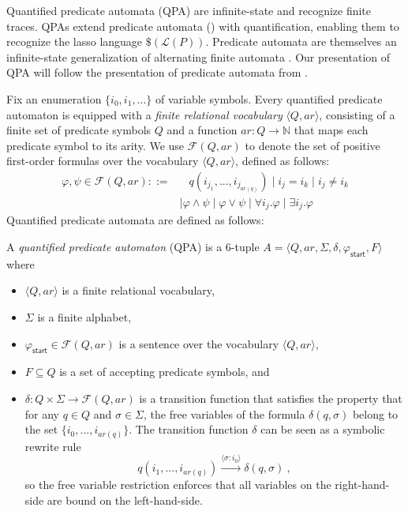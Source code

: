 \documentclass[9pt,nocopyrightspace]{sigplanconf}
\theoremstyle{definition}
\newcommand{\tuple}[1]{\langle #1 \rangle}
\newcommand{\ic}[2]{{\tuple{#1 : #2}}}
\newcommand{\lang}{\mathcal{L}}
\newcommand{\start}{\mathsf{start}}
\renewcommand{\phi}{\varphi}
\newcommand{\formulae}{\mathcal{F}}
\newcommand{\ar}{\textit{ar}}
\newcommand{\ftrace}{finite trace}
\begin{document}
Quantified predicate automata (QPA) are infinite-state and recognize \ftrace{}s.  QPAs extend predicate automata
(\cite{Farzan2015}) with quantification, enabling them to recognize the
lasso language $\$(\lang(P))$.  Predicate automata are themselves
an infinite-state generalization of alternating finite automata
\cite{Brzozowski1980,Chandra1981}.  Our presentation of QPA will follow the
presentation of predicate automata from \cite{Farzan2015}.

Fix an enumeration $\{i_0,i_1,...\}$ of variable symbols.  Every
quantified predicate automaton is equipped with a \emph{finite relational
  vocabulary} $\tuple{Q,\ar}$, consisting of a finite set of predicate symbols
$Q$ and a function $\ar : Q \rightarrow \mathbb{N}$ that maps each predicate
symbol to its arity.  We use $\formulae(Q,\ar)$ to denote the set of positive
first-order formulas over the vocabulary $\tuple{Q,\ar}$, defined as follows:
\begin{align*}
  \phi,\psi \in \formulae(Q,\ar) ::= &\;\;\; q(i_{j_1},...,i_{j_{\ar(q)}}) \mid i_{j} = i_k \mid i_j \neq i_k\\
  & \mid \phi \land \psi \mid \phi \lor \psi \mid \forall i_j. \phi \mid \exists i_j. \phi
\end{align*}
Quantified predicate automata are defined as follows:
\begin{definition}
  A \emph{quantified predicate automaton} (QPA) is a 6-tuple $A =
  \tuple{Q,\ar,\Sigma,\delta,\phi_\start,F}$ where
  \begin{itemize}
  \item $\tuple{Q,\ar}$ is a finite relational vocabulary,
  \item $\Sigma$ is a finite alphabet,
  \item $\phi_{\start} \in \formulae(Q,\ar)$ is a sentence over the vocabulary
    $\tuple{Q,\ar}$,
  \item $F \subseteq Q$ is a set of accepting predicate symbols, and
  \item $\delta : Q \times \Sigma \rightarrow \formulae(Q,\ar)$ is a
    transition function that satisfies the property that for any $q \in Q$ and
    $\sigma \in \Sigma$, the free variables of the formula $\delta(q,\sigma)$
    belong to the set $\{i_0,...,i_{\ar(q)}\}$.  The transition function
    $\delta$ can be seen as a symbolic rewrite rule
    \[ q(i_1,...,i_{\ar(q)}) \xrightarrow{\ic{\sigma}{i_0}} \delta(q,\sigma)\ , \]
    so the free variable restriction enforces that all variables on the
    right-hand-side are bound on the left-hand-side. \qedhere
  \end{itemize}
\end{definition}
\end{document}
